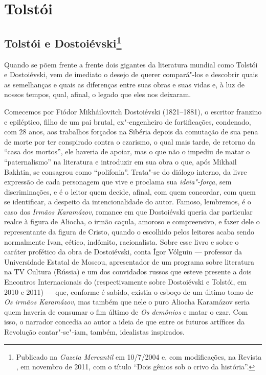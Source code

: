 \part{Tolstói}

\chapter{Tolstói e Dostoiévski\footnote{Publicado na \emph{Gazeta Mercantil} em 10/7/2004 e, com modificações, na Revista \protect{}, em novembro de 2011, com o título ``Dois gênios sob o crivo da história''.}}
\label{tolstoidosto}

Quando se põem frente a frente dois gigantes da literatura mundial
como Tolstói e Dostoiévski, vem de imediato o desejo de querer
compará"-los e descobrir quais as semelhanças e quais as
diferenças entre suas obras e suas vidas e, à luz de nossos
tempos, qual, afinal, o legado que eles nos deixaram. 

Comecemos por Fiódor Mikháilovitch Dostoiévski (1821--1881), o
escritor franzino e epiléptico, filho de um pai brutal,
ex"-engenheiro de fortificações, condenado, com 28 anos, aos
trabalhos forçados na Sibéria depois da comutação de sua pena de
morte por ter conspirado contra o czarismo, o qual mais tarde,
de retorno da ``casa dos mortos'', ele haveria de apoiar, mas o
que não o impediu de matar o ``paternalismo'' na literatura e
introduzir em sua obra o que, após Mikhail Bakhtin, se consagrou
como ``polifonia''. Trata"-se do diálogo interno, da livre
expressão de cada personagem que vive e proclama sua
\emph{ideia"-força}, sem discriminações, e é o leitor quem
decide, afinal, com quem concordar, com quem se identificar, a
despeito da intencionalidade do autor. Famoso, lembremos, é o caso dos
\emph{Irmãos Karamázov}, romance em que Dostoiévski queria
dar particular realce à figura de Aliocha, o irmão caçula,
amoroso e compreensivo, e fazer dele o representante da figura
de Cristo, quando o escolhido pelos leitores acaba sendo
normalmente Ivan, cético, indômito, racionalista. Sobre esse
livro e sobre o caráter profético da obra de Dostoiévski, conta
Ígor Vólguin --- professor da Universidade Estatal de Moscou,
apresentador de um programa sobre literatura na TV Cultura
(Rússia) e um dos convidados russos que esteve presente a dois
Encontros Internacionais do  (respectivamente sobre
Dostoiévski e Tolstói, em 2010 e 2011) --- que, conforme é sabido,
existia o esboço de um último tomo de \emph{Os irmãos Karamázov},
mas também que nele o puro Aliocha Karamázov seria quem haveria
de consumar o fim último de \emph{Os demônios} e matar o czar.
Com isso, o narrador concedia ao autor a ideia de que entre os
futuros artífices da Revolução contar"-se"-iam, também,
idealistas inspirados.


